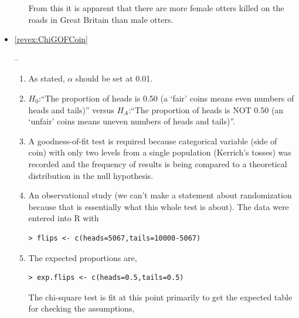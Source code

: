 \documentclass[10pt,openany]{book}\usepackage[]{graphicx}\usepackage[]{color}
\makeatletter
\newenvironment{kframe}{%
 \def\at@end@of@kframe{}%
 \ifinner\ifhmode%
  \def\at@end@of@kframe{\end{minipage}}%
  \begin{minipage}{\columnwidth}%
 \fi\fi%
 \def\FrameCommand##1{\hskip\@totalleftmargin \hskip-\fboxsep
 \colorbox{shadecolor}{##1}\hskip-\fboxsep
     \hskip-\linewidth \hskip-\@totalleftmargin \hskip\columnwidth}%
 \MakeFramed {\advance\hsize-\width
   \@totalleftmargin\z@ \linewidth\hsize
   \@setminipage}}%
 {\par\unskip\endMakeFramed%
 \at@end@of@kframe}
\newenvironment{knitrout}{}{} %
\makeatother
\begin{document}
\begin{itemize}
\begin{enumerate}
\begin{knitrout}
\begin{kframe}
\end{kframe}
\end{knitrout}
From this it is apparent that there are more female otters killed on the roads in Great Britain than male otters.
  \end{enumerate}
  \item \hypertarget{ans:ChiGOFCoin}{\ref{revex:ChiGOFCoin}} --
    \begin{enumerate}
      \item As stated, $\alpha$ should be set at 0.01.
      \item $H_{0}$:``The proportion of heads is 0.50 (a `fair' coins means even numbers of heads and tails)'' versus $H_{A}$:``The proportion of heads is NOT 0.50 (an `unfair' coins means uneven numbers of heads and tails)''.
      \item A goodness-of-fit test is required because categorical variable (side of coin) with only two levels from a single population (Kerrich's tosses) was recorded and the frequency of results is being compared to a theoretical distribution in the null hypothesis.
      \item An observational study (we can't make a statement about randomization because that is essentially what this whole test is about).  The data were entered into R with
\begin{knitrout}
\color{fgcolor}\begin{kframe}
\begin{verbatim}
> flips <- c(heads=5067,tails=10000-5067)
\end{verbatim}
\end{kframe}
\end{knitrout}
      \item The expected proportions are,
\begin{knitrout}
\color{fgcolor}\begin{kframe}
\begin{verbatim}
> exp.flips <- c(heads=0.5,tails=0.5)
\end{verbatim}
\end{kframe}
\end{knitrout}
The chi-square test is fit at this point primarily to get the expected table for checking the assumptions,
\begin{knitrout}
\color{fgcolor}\begin{kframe}
\begin{verbatim}

\end{verbatim}
\end{kframe}
\end{knitrout}
\end{enumerate}
\end{itemize}
\end{document}

